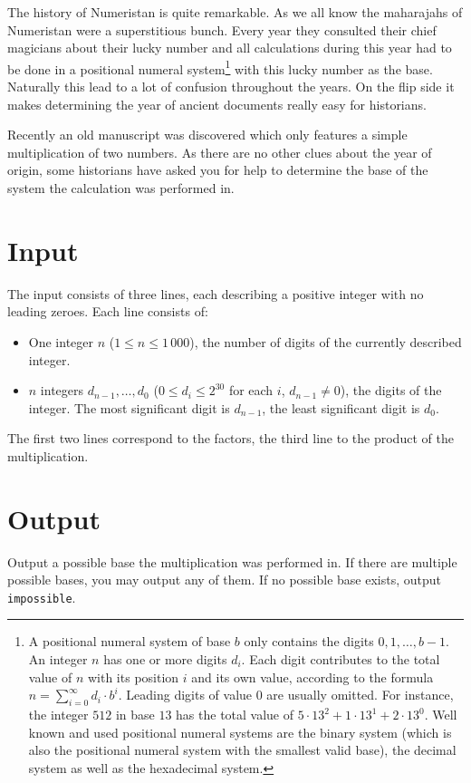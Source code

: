 The history of Numeristan is quite remarkable. As we all know the maharajahs of Numeristan were
a superstitious bunch. Every year they consulted their chief magicians about their lucky number and
all calculations during this year had to be done in a positional numeral system\footnote{
  A positional numeral system of base $b$ only contains the digits $0, 1, \ldots, b-1$.
  An integer $n$ has one or more digits $d_i$. Each digit contributes to the total value of $n$
  with its position $i$ and its own value, according to the formula $n=\sum_{i=0}^{\infty} d_i\cdot b^{i}$.
  Leading digits of value $0$ are usually omitted. For instance, the integer $512$
  in base $13$ has the total value of $5\cdot 13^2 + 1\cdot 13^1 + 2\cdot 13^0$.
  Well known and used positional numeral systems are the binary system (which is also the positional numeral system
  with the smallest valid base), the decimal system as well as the hexadecimal system.
} with this lucky number as the base. Naturally this lead to a lot of confusion throughout the years. On the
flip side it makes determining the year of ancient documents really easy for historians.

Recently an old manuscript was discovered which only features a simple multiplication of two numbers.
As there are no other clues about the year of origin, some historians have asked you for
help to determine the base of the system the calculation was performed in.

\section*{Input}
The input consists of three lines, each describing a positive integer with no leading zeroes. Each line consists of:
\begin{itemize}
\item One integer $n$ ($1 \le n \le 1\,000$), the number of digits of the currently described integer.
\item $n$ integers $d_{n-1}, \ldots, d_0$ ($0 \le d_i \le 2^{30}$ for each $i$, $d_{n-1} \ne 0$), the digits of the integer.
  The most significant digit is $d_{n-1}$, the least significant digit is $d_0$.
\end{itemize}
The first two lines correspond to the factors, the third line to the product of the multiplication.

\section*{Output}

Output a possible base the multiplication was performed in. If there are multiple possible bases, you may
output any of them. If no possible base exists, output \texttt{impossible}.
